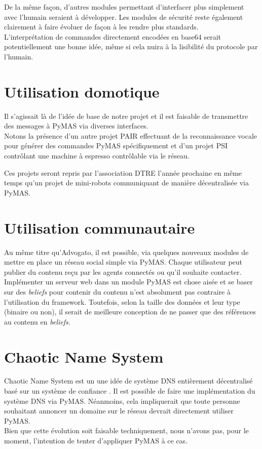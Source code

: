 \documentclass[11pt]{book}
\begin{document}
De la même façon, d'autres modules permettant d'interfacer plus simplement 
avec l'humain seraient à développer. Les modules de sécurité reste également
clairement à faire évoluer de façon à les rendre plus standards. \\
L'interprétation de commandes directement encodées en base64 serait 
potentiellement une bonne idée, même si cela nuira à la lisibilité du 
protocole par l'humain.

\section{Utilisation domotique}
Il s'agissait là de l'idée de base de notre projet et il est faisable de 
transmettre des messages à PyMAS via diverses interfaces. \\
Notons la présence d'un autre projet PAIR effectuant de la reconnaissance 
vocale pour générer des commandes PyMAS spécifiquement et d'un projet PSI 
contrôlant une machine à espresso contrôlable via le réseau.

Ces projets seront repris par l'association DTRE l'année prochaine en même 
temps qu'un projet de mini-robots communiquant de manière décentralisée via 
PyMAS.

\section{Utilisation communautaire}
Au même titre qu'Advogato, il est possible, via quelques nouveaux modules 
de mettre en place un réseau social simple via PyMAS. Chaque utilisateur 
peut publier du contenu reçu par les agents connectés ou qu'il souhaite 
contacter. \\
Implémenter un serveur web dans un module PyMAS est chose aisée et se baser 
sur des \textit{beliefs} pour contenir du contenu n'est absolument pas 
contraire à l'utilisation du framework. Toutefois, selon la taille des 
données et leur type (binaire ou non), il serait de meilleure conception de 
ne passer que des références au contenu en \textit{beliefs}.

\section{Chaotic Name System}
Chaotic Name System est un une idée de système DNS entièrement décentralisé
basé sur un système de confiance \cite{nicelab2012chaotic}. Il est possible 
de faire une implémentation du système DNS via PyMAS. Néanmoins, cela 
impliquerait que toute personne souhaitant annoncer un domaine sur le réseau 
devrait directement utiliser PyMAS. \\ 
Bien que cette évolution soit faisable techniquement, nous n'avons pas, pour 
le moment, l'intention de tenter d'appliquer PyMAS à ce cas.
\end{document}

